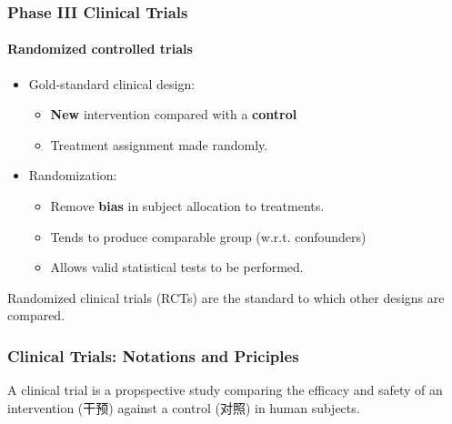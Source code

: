 \documentclass[table,10pt]{beamer}
\begin{document}
\begin{CJK*}{UTF8}{gbsn}
\begin{frame}[t]
\frametitle{Phase III Clinical Trials}
\framesubtitle{Randomized controlled trials}
\begin{itemize}
	\item Gold-standard clinical design:
	\begin{itemize}
		\item \textbf{New} intervention compared with a \textbf{control}
		\item Treatment assignment made randomly.
	\end{itemize}
	\item Randomization:
	\begin{itemize}
		\item Remove \textbf{bias} in subject allocation to treatments.
		\item Tends to produce comparable group (w.r.t. confounders)
		\item Allows valid statistical tests to be performed.	
	\end{itemize}
\end{itemize}
Randomized clinical trials (RCTs) are the standard to which other designs are compared.
\end{frame}

\begin{frame}[t]
\frametitle{Clinical Trials: Notations and Priciples}
A clinical trial is a \alert{propspective study} comparing the \alert{efficacy and safety} 
of an \alert{intervention (干预)} against a \alert{control (对照)} in human subjects.


\end{frame}



\end{CJK*}
\end{document}
